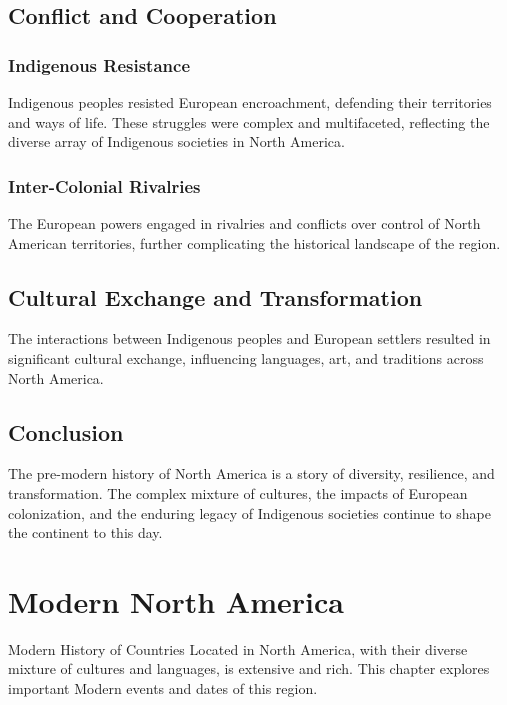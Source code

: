 \documentclass[a4paper,12pt]{book}
\begin{document}
\section{Conflict and Cooperation}
\label{sec:conflict-cooperation}

\subsection{Indigenous Resistance}
Indigenous peoples resisted European encroachment, defending their territories and ways of life. These struggles were complex and multifaceted, reflecting the diverse array of Indigenous societies in North America.

\subsection{Inter-Colonial Rivalries}
The European powers engaged in rivalries and conflicts over control of North American territories, further complicating the historical landscape of the region.

\section{Cultural Exchange and Transformation}
\label{sec:cultural-exchange-transformation}
The interactions between Indigenous peoples and European settlers resulted in significant cultural exchange, influencing languages, art, and traditions across North America.

\section{Conclusion}
\label{sec:conclusion-north-america}
The pre-modern history of North America is a story of diversity, resilience, and transformation. The complex mixture of cultures, the impacts of European colonization, and the enduring legacy of Indigenous societies continue to shape the continent to this day.

\chapter{Modern North America}
\label{ch:modern-history-north-america}

Modern History of Countries Located in North America, with their diverse mixture of cultures and languages, is extensive and rich. This chapter explores important Modern events and dates of this region.
\end{document}

